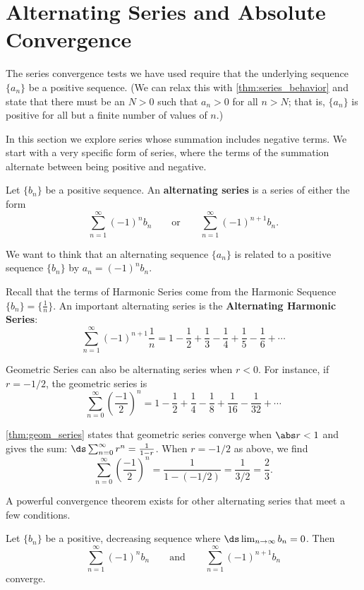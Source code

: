 \section{Alternating Series and Absolute Convergence}\label{sec:alt_series}

The series convergence tests we have used require that the underlying sequence $\{a_n\}$ be a positive sequence. (We can relax this with \autoref{thm:series_behavior} and state that there must be an $N>0$ such that $a_n>0$ for all $n>N$; that is, $\{a_n\}$ is positive for all but a finite number of values of $n$.)

In this section we explore series whose summation includes negative terms. We start with a very specific form of series, where the terms of the summation alternate between being positive and negative.

\begin{definition}\label{def:alt_series}%
Let $\{b_n\}$ be a positive sequence. An \textbf{alternating series} is a series of either the form
\[
\sum_{n=1}^\infty (-1)^nb_n\qquad \text{or}\qquad \sum_{n=1}^\infty (-1)^{n+1}b_n.
\]
\end{definition}

We want to think that an alternating sequence $\{a_n\}$ is related to a positive sequence $\{b_n\}$ by $a_n=(-1)^n b_n$.

Recall that the terms of Harmonic Series come from the Harmonic Sequence $\{b_n\} = \{\frac1n\}$. An important alternating series is the \textbf{Alternating Harmonic Series}:
\[
\sum_{n=1}^\infty (-1)^{n+1}\frac1n
= 1-\frac12+\frac13-\frac14+\frac15-\frac16+\dotsb
\]

Geometric Series can also be alternating series when $r<0$. For instance, if $r=-1/2$, the geometric series is
\[
\sum_{n=0}^\infty \left(\frac{-1}{2}\right)^n
= 1-\frac12+\frac14-\frac18+\frac1{16}-\frac1{32}+\dotsb
\]

\autoref{thm:geom_series} states that geometric series converge when $\abs r<1$ and gives the sum: $\ds \sum_{n=0}^\infty r^n = \frac1{1-r}$. When $r=-1/2$ as above, we find
\[
\sum_{n=0}^\infty\left(\frac{-1}{2}\right)^n=\frac1{1-(-1/2)}=\frac 1{3/2}=\frac23.
\]

A powerful convergence theorem exists for other alternating series that meet a few conditions.

\begin{theorem}\label{thm:alt_series_test}%
Let $\{b_n\}$ be a positive, decreasing sequence where $\ds\lim_{n\to\infty}b_n=0$. Then
\[
\sum_{n=1}^\infty (-1)^{n}b_n \qquad \text{and}\qquad \sum_{n=1}^\infty (-1)^{n+1}b_n
\]
converge.
\end{theorem}

